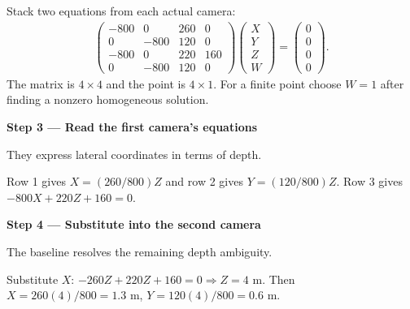 \documentclass[letterpaper,11pt,english,openany,oneside]{jupyterBook}
\begin{document}
\sphinxAtStartPar
Stack two equations from each actual camera:
{\color{QuizMathBlue} \begin{equation*}
\begin{split}
\begin{pmatrix}-800&0&260&0\\0&-800&120&0\\-800&0&220&160\\0&-800&120&0\end{pmatrix}
\begin{pmatrix}X\\Y\\Z\\W\end{pmatrix}=\begin{pmatrix}0\\0\\0\\0\end{pmatrix}.
\end{split}
\end{equation*}}
\sphinxAtStartPar
The matrix is {\color{QuizMathBlue} \(4\times4\)} and the point is {\color{QuizMathBlue} \(4\times1\)}. For a finite point choose {\color{QuizMathBlue} \(W=1\)} after finding a nonzero homogeneous solution.

\par

\par\medskip{}
{\color{QuizStepRed}\bfseries Step 3 — Read the first camera's equations}\par\smallskip

\sphinxAtStartPar
{} They express lateral coordinates in terms of depth.

\sphinxAtStartPar
Row 1 gives {\color{QuizMathBlue} \(X=(260/800)Z\)} and row 2 gives {\color{QuizMathBlue} \(Y=(120/800)Z\)}. Row 3 gives {\color{QuizMathBlue} \(-800X+220Z+160=0\)}.

\par

\par\medskip{}
{\color{QuizStepRed}\bfseries Step 4 — Substitute into the second camera}\par\smallskip

\sphinxAtStartPar
{} The baseline resolves the remaining depth ambiguity.

\sphinxAtStartPar
Substitute {\color{QuizMathBlue} \(X\)}: {\color{QuizMathBlue} \(-260Z+220Z+160=0\Rightarrow Z=4\)} m. Then {\color{QuizMathBlue} \(X=260(4)/800=1.3\)} m, {\color{QuizMathBlue} \(Y=120(4)/800=0.6\)} m.
\end{document}
